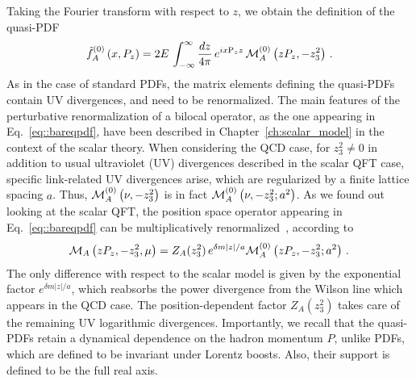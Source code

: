 %
Taking
the Fourier transform with respect to $z$, we obtain the definition of the
quasi-PDF  
\begin{align}
	\label{eq::bareqpdf}                                                 
	\tilde{f}_A^{(0)}\left( x, P_z\right) = 
	2 E \, \int_{-\infty}^{\infty}\frac{dz}{4\pi}\,e^{i x \text{P}_z z}\,\mathcal{M}_A^{(0)}\left( zP_z,-z_3^2 \right)\,. 
\end{align}
As in the case of standard PDFs,
the matrix elements defining the quasi-PDFs contain UV divergences, and need to be renormalized. The
main features of the perturbative renormalization of a bilocal operator, 
as the one appearing in Eq.~\eqref{eq::bareqpdf}, have been described in Chapter~\ref{ch:scalar_model}
in the context of the scalar theory.
When considering the QCD case, for $z_3^2  \neq 0$ 
in addition to usual ultraviolet (UV) divergences described in the scalar QFT case, 
specific link-related UV divergences arise, which are regularized by a finite lattice spacing $a$. 
Thus, $\mathcal{M}_A^{(0)}\left( \nu,-z_3^2 \right)$ is in fact $\mathcal{M}_A^{(0)}\left( \nu,-z_3^2; a^2 \right)$.
As we found out looking at the scalar QFT,
the position space operator appearing in Eq.~\eqref{eq::bareqpdf} can be multiplicatively
renormalized~\cite{Ishikawa:2017faj}, according to
\begin{align}
    \mathcal{M}_A\left( z P_z,-z_3^2, \mu \right) = Z_{A}(z_3^2)\,
    e^{\delta m |z|/a} \mathcal{M}_A^{(0)}\left( z P_z,-z_3^2; a^2 \right)\,.
\end{align}
The only difference with respect to the scalar model is given by
the exponential factor $e^{\delta m |z|/a}$, which reabsorbs the power divergence
from the Wilson line which appears in the QCD case. The position-dependent factor $Z_{A}(z_3^2)$ takes care of
the remaining UV logarithmic divergences.  
%
Importantly, we recall that the quasi-PDFs retain a dynamical dependence on the hadron momentum
$P$, unlike PDFs, which are defined to be invariant under Lorentz boosts. Also,
their support is defined to be the full real axis.

